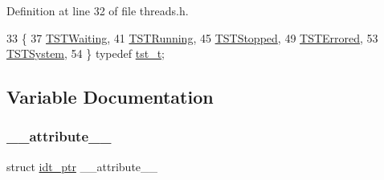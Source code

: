 Definition at line 32 of file threads.\+h.


\begin{DoxyCode}
33 \{
37     \hyperlink{a00044_a3895f03bb811310833570ff0b8a403d9_a3895f03bb811310833570ff0b8a403d9a4e9798f9291920da4dba13ed8d1bf2b4}{TSTWaiting},
41     \hyperlink{a00044_a3895f03bb811310833570ff0b8a403d9_a3895f03bb811310833570ff0b8a403d9ac0336457632847436b12bd36b2642808}{TSTRunning},
45     \hyperlink{a00044_a3895f03bb811310833570ff0b8a403d9_a3895f03bb811310833570ff0b8a403d9a29a580a1a7b4350246c83d171567f7fc}{TSTStopped},
49     \hyperlink{a00044_a3895f03bb811310833570ff0b8a403d9_a3895f03bb811310833570ff0b8a403d9a8117b53a7299ca12df9b2a7bd320689f}{TSTErrored},
53     \hyperlink{a00044_a3895f03bb811310833570ff0b8a403d9_a3895f03bb811310833570ff0b8a403d9a1b2cdb1c39a3cb21ddb3efc42d1cc5b9}{TSTSystem},
54 \} \textcolor{keyword}{typedef} \hyperlink{a00044_a3895f03bb811310833570ff0b8a403d9_a3895f03bb811310833570ff0b8a403d9}{tst\_t};
\end{DoxyCode}


\subsection{Variable Documentation}
\mbox{\label{a00044_acf8c839d8a7a12772ebd4b8a4c087034_acf8c839d8a7a12772ebd4b8a4c087034}} 
\subsubsection{\texorpdfstring{\+\_\+\+\_\+attribute\+\_\+\+\_\+}{\_\_attribute\_\_}}
{\footnotesize\ttfamily struct \hyperlink{a00072}{idt\+\_\+ptr} \+\_\+\+\_\+attribute\+\_\+\+\_\+}

